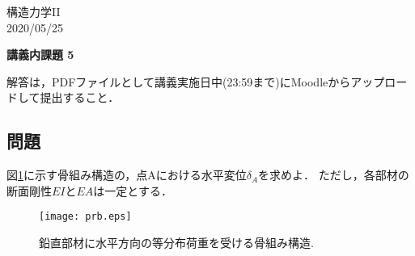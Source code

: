 \documentclass[10pt,a4j]{jarticle}
\newlength{\minitwocolumn}
\begin{document}
\newcommand{\fat}[1]{\mbox{\boldmath $#1$}}
\newcommand{\D}{\partial}
\newcommand{\w}{\omega}
\newcommand{\ga}{\alpha}
\newcommand{\gb}{\beta}
\newcommand{\gx}{\xi}
\newcommand{\gz}{\zeta}
\newcommand{\vhat}[1]{\hat{\fat{#1}}}
\newcommand{\spc}{\vspace{0.7\baselineskip}}
\newcommand{\halfspc}{\vspace{0.3\baselineskip}}

\newcommand{\twofig}[2]
 {
   \begin{figure}
     \begin{minipage}[t]{\minitwocolumn}
         \begin{center}   #1
         \end{center}
     \end{minipage}
         \hspace{\columnsep}
     \begin{minipage}[t]{\minitwocolumn}
         \begin{center} #2
         \end{center}
     \end{minipage}
   \end{figure}
 }
\begin{flushright}
	構造力学II\\
	 2020/05/25
\end{flushright}
\begin{center}
	{\LARGE	\bf 講義内課題 5} 
\end{center}
\vspace{10mm}
解答は，PDFファイルとして講義実施日中(23:59まで)にMoodleからアップロードして提出すること．
\subsection*{問題}
図\ref{fig:prb}に示す骨組み構造の，点Aにおける水平変位$\delta_A$を求めよ．
ただし，各部材の断面剛性$EI$と$EA$は一定とする．
\begin{figure}[h]
	\begin{center}
	\texttt{[image: prb.eps]} 
	\end{center}
	\caption{鉛直部材に水平方向の等分布荷重を受ける骨組み構造.} 
	\label{fig:prb}
\end{figure}
\end{document}
